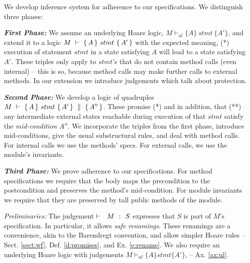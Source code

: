 We %
develop   inference system for adherence to our specifications.
We distinguish three phases:

\vspace{.05cm}
\textit{\textbf{First Phase:}} We assume  an underlying Hoare logic, ${M \vdash_{ul}  \{A\} {\ stmt\ } \{A'\} }$, and extend it to a logic  %
  ${\hproves{M}  {A} {\ stmt\ }{A'} }$  with %
the expected meaning, \ie 
(*) execution of statement $stmt$ in a state satisfying %
$A$ will lead to a state satisfying  %
$A'$.
These triples only apply to   $stmt$'s  that  do not contain method calls  (even internal) -- this is so, because method calls may make further calls to   external methods.
In our extension we  introduce   judgements   which 
talk about protection.

\vspace{.05cm}

\textit{\textbf{Second Phase:}} We develop a logic of quadruples ${M\ \vdash\ \{\,A\, \} \ stmt\  \{\,A'\, \}\, \,\parallel\,\, \{\, A'' \, \}}$. These promise  (*) and  
in addition,   that (**) any intermediate external states reachable during execution of that $stmt$
 satisfy the \emph{mid-condition}  $A''$.  
 We incorporate the triples from the first phase,       
introduce  mid-conditions, give the usual substructural rules, and deal with method calls. 
For internal   calls we use the methods' specs. %
For external   calls, we   use %
 the module's invariants. 
 
 \vspace{.05cm}
 
\textit{\textbf{Third Phase:} } We prove adherence  to  our specifications. 
For method specifications we require that the body maps the precondition to the postcondition and preserves the method's  mid-condition. 
For module invariants we require that they  are preserved by tall public methods of the module.

 \vspace{.1cm}

\noindent
\textit{Preliminaries:} %
%
The judgement    ${{\vdash \ \ M\ \ \mathbf{:}\ \ S}}$ expresses that $S$ is part of $M$'s specification.  
In particular, it allows   \emph{safe  renamings}. 
These renamings are   a convenience, akin to the Barendregt convention, and  allow simpler Hoare rules  -- \cf Sect. \ref{sect:wf},
Def. \ref{d:promises}, and Ex. \ref{e:rename}. We also require an underlying Hoare logic with judgements $M \vdash_{ul} \{ A \} stmt \{ A' \}$, 
-- \cf Ax. \ref{ax:ul}.



